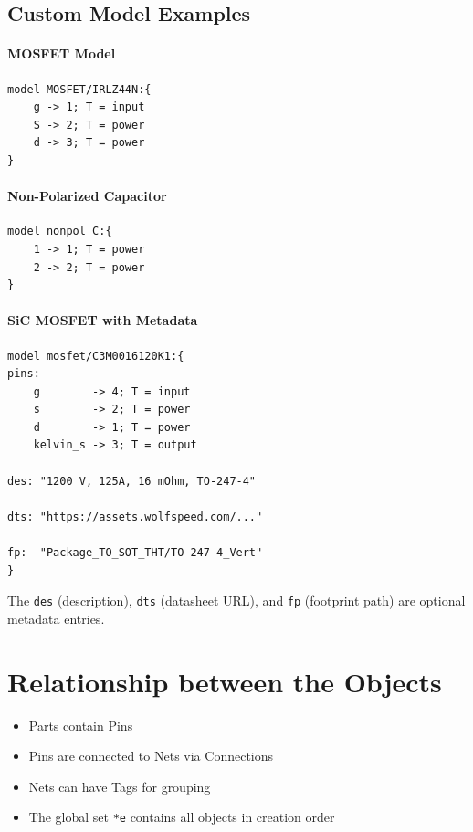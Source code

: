 \subsection{Custom Model Examples}

\paragraph{MOSFET Model}
\begin{verbatim}
model MOSFET/IRLZ44N:{
    g -> 1; T = input
    S -> 2; T = power
    d -> 3; T = power
}
\end{verbatim}

\paragraph{Non-Polarized Capacitor}
\begin{verbatim}
model nonpol_C:{
    1 -> 1; T = power
    2 -> 2; T = power
}
\end{verbatim}

\paragraph{SiC MOSFET with Metadata}
\begin{verbatim}
model mosfet/C3M0016120K1:{
pins:
    g        -> 4; T = input
    s        -> 2; T = power
    d        -> 1; T = power
    kelvin_s -> 3; T = output

des: "1200 V, 125A, 16 mOhm, TO-247-4"

dts: "https://assets.wolfspeed.com/..."

fp:  "Package_TO_SOT_THT/TO-247-4_Vert"
}
\end{verbatim}

The \texttt{des} (description), \texttt{dts} (datasheet URL), and \texttt{fp} (footprint path) are optional metadata entries.

\section{Relationship between the Objects}
\begin{itemize}
\item Parts contain Pins
\item Pins are connected to Nets via Connections
\item Nets can have Tags for grouping
\item The global set \texttt{*e} contains all objects in creation order
\end{itemize}


